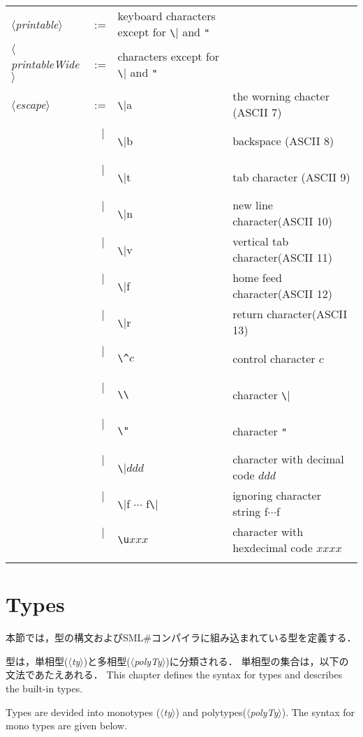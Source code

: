 \documentclass{jbook}
\newcommand{\txt}[2]{#2}
\newcommand{\smlsharp}{SML\#}
\newcommand{\vbar}{\mbox{\ $|$\ }}
\newcommand{\nonterm}[1]{\mbox{$\langle$}{\it #1}\mbox{$\rangle$}}
\begin{document}
\begin{description}
\begin{center}
\begin{tabular}{lcll}
\nonterm{printable} &:=& keyboard characters except for \verb|\| and \verb|"|\\
\nonterm{printableWide} &:=& characters except for \verb|\| and \verb|"|\\
\nonterm{escape} &:=& \verb|\|a & the worning chacter (ASCII 7)\\
&\vbar&\verb|\|b & backspace (ASCII 8)\\
&\vbar&\verb|\|t & tab character (ASCII 9)\\
&\vbar&\verb|\|n & new line character(ASCII 10)\\
&\vbar&\verb|\|v & vertical tab character(ASCII 11)\\
&\vbar&\verb|\|f & home feed character(ASCII 12)\\
&\vbar&\verb|\|r & return character(ASCII 13)\\
&\vbar&\verb|\^|$c$ &control character $c$\\
&\vbar&\verb|\\| & character \verb|\|\\
&\vbar&\verb|\"| & character \verb|"|\\   %
&\vbar&\verb|\|$ddd$ &
character with decimal code $ddd$\\
&\vbar&\verb|\|f $\cdots$ f\verb|\|& ignoring character string f$\cdots$f
\\
&\vbar&\verb|\u|$xxx$& character with hexdecimal code $xxxx$\\
\\
\end{tabular}
\end{center}
\fi%
\end{description}

\chapter{\txt{型}{Types}}
\label{sec:setOfTypes}

\ifjp%
	本節では，型の構文および\smlsharp{}コンパイラに組み込まれている型を定義する．
	
	型は，単相型(\nonterm{ty})と多相型(\nonterm{polyTy})に分類される．
	単相型の集合は，以下の文法であたえあれる．
\else%
	This chapter defines the syntax for types and describes the
built-in types.

	Types are devided into monotypes (\nonterm{ty}) and polytypes(\nonterm{polyTy}).
	The syntax for mono types are given below.
\fi%
\end{document}
